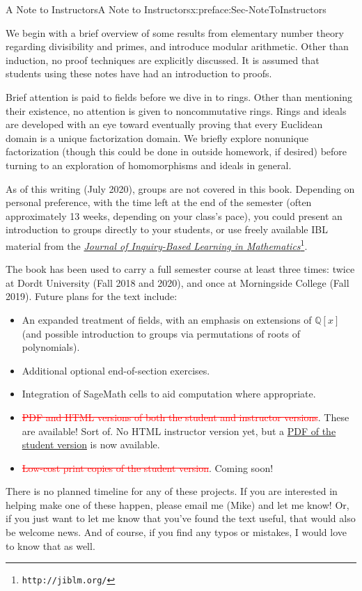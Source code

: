 \documentclass[oneside,10pt,]{book}
\newcommand{\deletethick}{.25ex}
\newcommand{\deleted}[1]{\renewcommand{\ULthickness}{\deletethick}\textcolor{red}{\sout{#1}}}
\numberwithin{equation}{section}
\def\Q{{\mathbb Q}}
\begin{document}
\begin{preface}{A Note to Instructors}{}{A Note to Instructors}{}{}{x:preface:Sec-NoteToInstructors}
\begin{itemize}[label=\textbullet]
\end{itemize}
%
\par
We begin with a brief overview of some results from elementary number theory regarding divisibility and primes, and introduce modular arithmetic. Other than induction, no proof techniques are explicitly discussed. It is assumed that students using these notes have had an introduction to proofs.%
\par
Brief attention is paid to fields before we dive in to rings. Other than mentioning their existence, no attention is given to noncommutative rings. Rings and ideals are developed with an eye toward eventually proving that every Euclidean domain is a unique factorization domain. We briefly explore nonunique factorization (though this could be done in outside homework, if desired) before turning to an exploration of homomorphisms and ideals in general.%
\par
As of this writing (July 2020), groups are not covered in this book. Depending on personal preference, with the time left at the end of the semester (often approximately 1\textendash{}3 weeks, depending on your class's pace), you could present an introduction to groups directly to your students, or use freely available IBL material from the \href{http://jiblm.org/}{\emph{Journal of Inquiry-Based Learning in Mathematics}}\footnote{\nolinkurl{http://jiblm.org/}\label{g:fn:idp105544811411856}}.%
\par
The book has been used to carry a full semester course at least three times: twice at Dordt University (Fall 2018 and 2020), and once at Morningside College (Fall 2019). Future plans for the text include:%
\begin{itemize}[label=\textbullet]
\item{}An expanded treatment of fields, with an emphasis on extensions of \(\Q[x]\) (and possible introduction to groups via permutations of roots of polynomials).%
\item{}Additional optional end-of-section exercises.%
\item{}Integration of SageMath cells to aid computation where appropriate.%
\item{}\deleted{PDF and HTML versions of both the student and instructor versions}. These are available! Sort of. No HTML instructor version yet, but a \hyperref[x:preface:Sec-Versions]{PDF of the student version} is now available.%
\item{}\deleted{Low-cost print copies of the student version}. Coming soon!%
\end{itemize}
There is no planned timeline for any of these projects. If you are interested in helping make one of these happen, please email me (Mike) and let me know! Or, if you just want to let me know that you've found the text useful, that would also be welcome news. And of course, if you find any typos or mistakes, I would love to know that as well.%
\end{preface}
\end{document}

